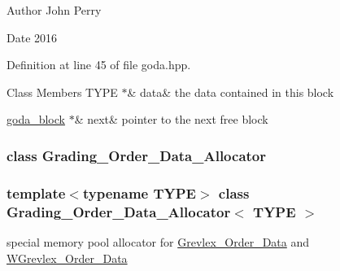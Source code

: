 \begin{DoxyAuthor}{Author}
John Perry 
\end{DoxyAuthor}
\begin{DoxyDate}{Date}
2016 
\end{DoxyDate}


Definition at line 45 of file goda.\+hpp.

\begin{DoxyFields}{Class Members}
\mbox{\label{group__memorygroup_ad5bea3a00bf688f2db31ad5db90e3deb}} 
TYPE $\ast$&
data&
the data contained in this block \\
\hline

\mbox{\label{group__memorygroup_a1f5592b3fed7857bf9336a8e4fba4fdc}} 
\hyperlink{group__memorygroup_uniongoda__block}{goda\_block} $\ast$&
next&
pointer to the next free block \\
\hline

\end{DoxyFields}
\label{class_grading___order___data___allocator}
\subsubsection{class Grading\+\_\+\+Order\+\_\+\+Data\+\_\+\+Allocator}
\subsubsection*{template$<$typename T\+Y\+PE$>$\newline
class Grading\+\_\+\+Order\+\_\+\+Data\+\_\+\+Allocator$<$ T\+Y\+P\+E $>$}

special memory pool allocator for \hyperlink{group__orderinggroup_class_grevlex___order___data}{Grevlex\+\_\+\+Order\+\_\+\+Data} and \hyperlink{group__orderinggroup_class_w_grevlex___order___data}{W\+Grevlex\+\_\+\+Order\+\_\+\+Data} 

